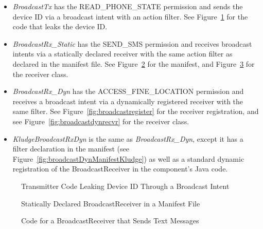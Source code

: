\begin{itemize}
\item{} \emph{BroadcastTx} has the READ\_PHONE\_STATE permission and sends the device ID via a broadcast intent with an action filter. See Figure~\ref{fig:broadcastleak} for the code that leaks the device ID.

\item{} \emph{BroadcastRx\_Static} has the SEND\_SMS permission and receives broadcast intents via a statically declared receiver with the same action filter as declared in the manifest file.  See Figure~\ref{fig:broadcastmanifest} for the manifest, and Figure~\ref{fig:broadcaststaticrecvr} for the receiver class.

\item{} \emph{BroadcastRx\_Dyn} has the ACCESS\_FINE\_LOCATION permission and receives a broadcast intent via a dynamically registered receiver with the same filter.  See Figure~\ref{fig:broadcastregister} for the receiver registration, and see Figure~\ref{fig:broadcastdynrecvr} for the receiver class. 

\item{} \emph{KludgeBroadcastRxDyn} is the same as \emph{BroadcastRx\_Dyn}, except it has a filter declaration in the manifest (see Figure~\ref{fig:broadcastDynManifestKludge}) as well as a standard dynamic registration of the BroadcastReceiver in the component’s Java code. 
\end{itemize} 


\begin{figure}[!h]
\begin{framed}

\caption{Transmitter Code Leaking Device ID Through a Broadcast Intent}
\label{fig:broadcastleak}
\end{framed}
\end{figure}

\begin{figure}[!h]
\begin{framed}

\caption{Statically Declared BroadcastReceiver in a Manifest File}
\label{fig:broadcastmanifest}
\end{framed}
\end{figure}

\begin{figure}[!h]
\begin{framed}

\caption{Code for a BroadcastReceiver that Sends Text Messages}
\label{fig:broadcaststaticrecvr}
\end{framed}
\end{figure}

